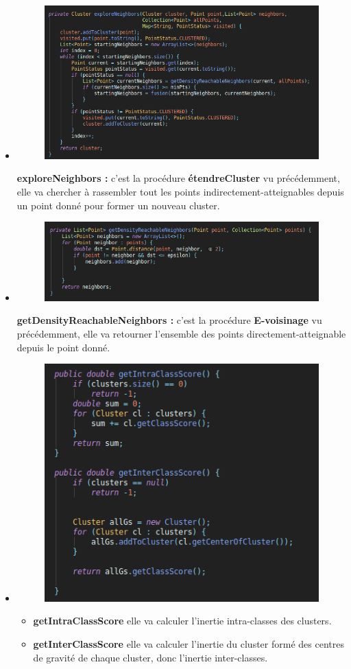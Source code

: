 \begin{itemize}
\begin{itemize}
				\item \begin{figure}[H]
					\centering
					\includegraphics[width=0.75\linewidth]{dbscan/images/dbscan/expand.png}
				\end{figure} \textbf{exploreNeighbors : } c'est la procédure \textbf{étendreCluster} vu précédemment, elle va chercher à rassembler tout les points indirectement-atteignables depuis un point donné pour former un nouveau cluster.
			
				\item \begin{figure}[H]
					\centering
					\includegraphics[width=0.75\linewidth]{dbscan/images/dbscan/neighborhood.png}
				\end{figure} \textbf{getDensityReachableNeighbors : } c'est la procédure \textbf{E-voisinage} vu précédemment, elle va retourner l'ensemble des points directement-atteignable depuis le point donné.
				
				\item \begin{figure}[H]
					\centering
					\includegraphics[width=0.55\linewidth]{dbscan/images/dbscan/score.png}
				\end{figure} 
				\begin{itemize}
					\item \textbf{getIntraClassScore} elle va calculer l'inertie intra-classes des clusters.
					\item \textbf{getInterClassScore} elle va calculer l'inertie du cluster formé des centres de gravité de chaque cluster, donc l'inertie inter-classes.
				\end{itemize}
			\end{itemize}
			

\end{itemize}
